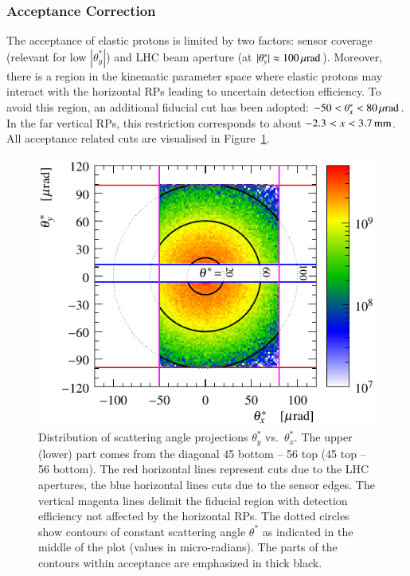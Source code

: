 
\subsubsection{Acceptance Correction}
\label{sec:acc corr}

The acceptance of elastic protons is limited by two factors: sensor coverage (relevant for low $|\theta^*_y|$) and LHC beam aperture (at $|\theta^*_y| \approx 100\,{\rm \mu rad}$). Moreover, there is a region in the kinematic parameter space where elastic protons may interact with the horizontal RPs leading to uncertain detection efficiency. To avoid this region, an additional fiducial cut has been adopted: $-50 < \theta_x^* < 80\,{\rm \mu rad}$. In the far vertical RPs, this restriction corresponds to about $-2.3 < x < 3.7\,{\rm mm}$. All acceptance related cuts are visualised in Figure~\ref{fig:acc corr princ}.

\begin{figure}
\begin{center}
\includegraphics{fig/acc_corr_phi_lab.pdf}
\caption{%
Distribution of scattering angle projections $\theta_y^*$ vs.~$\theta_x^*$. The upper (lower) part comes from the diagonal 45 bottom -- 56 top (45 top -- 56 bottom). The red horizontal lines represent cuts due to the LHC apertures, the blue horizontal lines cuts due to the sensor edges. The vertical magenta lines delimit the fiducial region with detection efficiency not affected by the horizontal RPs. The dotted circles show contours of constant scattering angle $\theta^*$ as indicated in the middle of the plot (values in micro-radians). The parts of the contours within acceptance are emphasized in thick black.
}
\label{fig:acc corr princ}
\end{center}
\end{figure}

